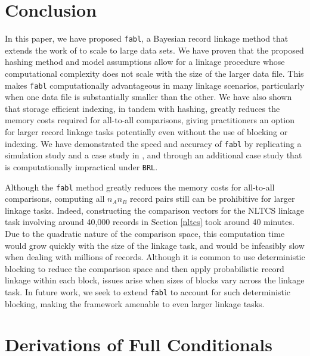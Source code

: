 \documentclass[ba]{imsart}
\begin{document}
	
	\section{Conclusion}
	\label{discussion}
	
	In this paper, we have proposed \texttt{fabl}, a Bayesian record linkage method that extends the work of \cite{sadinle_bayesian_2017} to scale to large data sets. We have proven that the proposed hashing method and model assumptions allow for a linkage procedure whose computational complexity does not scale with the size of the larger data file. This makes \texttt{fabl} computationally advantageous in many linkage scenarios, particularly when one data file is substantially smaller than the other. We have also shown that storage efficient indexing, in tandem with hashing, greatly reduces the memory costs required for all-to-all comparisons, giving practitioners an option for larger record linkage tasks potentially even without the use of blocking or indexing. We have demonstrated the speed and accuracy of \texttt{fabl} by replicating a simulation study and a case study in \cite{sadinle_bayesian_2017}, and through an additional case study that is computationally impractical under \texttt{BRL}. 
	
	Although the \texttt{fabl} method greatly reduces the memory costs for all-to-all comparisons, computing all $n_A  n_B$ record pairs still can be prohibitive for larger linkage tasks. Indeed, constructing the comparison vectors for the NLTCS linkage task involving around 40,000 records in Section \ref{nltcs} took around 40 minutes. Due to the quadratic nature of the comparison space, this computation time would grow quickly with the size of the linkage task, and would be infeasibly slow when dealing with millions of records. Although it is common to use deterministic blocking to reduce the comparison space and then apply probabilistic record linkage within each block, issues arise when sizes of blocks vary across the linkage task. In future work, we seek to extend \texttt{fabl} to account for such deterministic blocking, making the framework amenable to even larger linkage tasks.

	
	\clearpage
	
	\bigskip
	
	
	
	
	\clearpage
	

\appendix
	
		
	
	\hypertarget{app:derivations}{%
	\section{Derivations of Full Conditionals}\label{app:derivations}}
\end{document}
